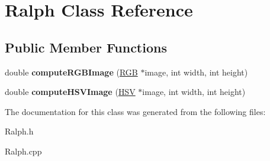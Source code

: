 \hypertarget{class_ralph}{\section{Ralph Class Reference}
\label{class_ralph}
}
\subsection*{Public Member Functions}
\begin{DoxyCompactItemize}
\item 
\hypertarget{class_ralph_ab269d8a3ad97335078fe1dbe2c125ff6}{double {\bfseries compute\-R\-G\-B\-Image} (\hyperlink{struct_r_g_b}{R\-G\-B} $\ast$image, int width, int height)}\label{class_ralph_ab269d8a3ad97335078fe1dbe2c125ff6}

\item 
\hypertarget{class_ralph_a139bcc99790667b998a48719b20e9b2a}{double {\bfseries compute\-H\-S\-V\-Image} (\hyperlink{struct_h_s_v}{H\-S\-V} $\ast$image, int width, int height)}\label{class_ralph_a139bcc99790667b998a48719b20e9b2a}

\end{DoxyCompactItemize}


The documentation for this class was generated from the following files\-:\begin{DoxyCompactItemize}
\item 
Ralph.\-h\item 
Ralph.\-cpp\end{DoxyCompactItemize}
